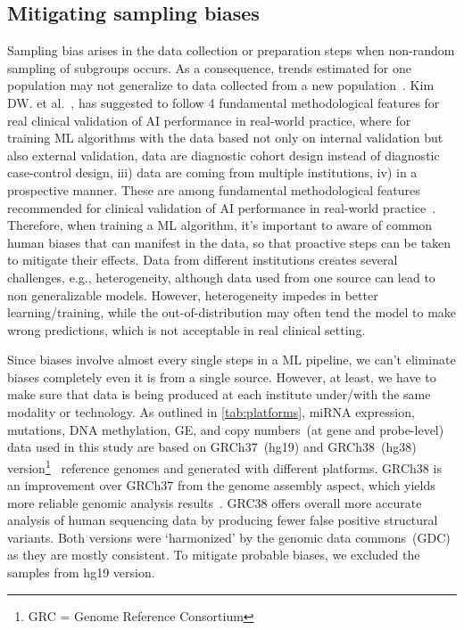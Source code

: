 \subsection{Mitigating sampling biases}
Sampling bias arises in the data collection or preparation steps when non-random sampling of subgroups occurs. As a consequence, trends estimated for one population may not generalize to data collected from a new population~\cite{mehrabi2019survey}. Kim DW. et al.~\cite{kim2019design}, has suggested to follow 4 fundamental methodological features for real clinical validation of AI performance in real-world practice, where for training ML algorithms with the data based not only on internal validation but also external validation, data are diagnostic cohort design instead of diagnostic case-control design, iii) data are coming from multiple institutions, iv) in a prospective manner. These are among fundamental methodological features recommended for clinical validation of AI performance in real-world practice~\cite{kim2019design}. Therefore, when training a ML algorithm, it's important to aware of common human biases that can manifest in the data, so that proactive steps can be taken to mitigate their effects. Data from different institutions creates several challenges, e.g., heterogeneity, although data used from one source can lead to non generalizable models. However, heterogeneity impedes in better learning/training, while the out-of-distribution may often tend the model to make wrong predictions, which is not acceptable in real clinical setting. 

\hspace*{3.5mm} Since biases involve almost every single steps in a ML pipeline, we can't eliminate biases completely even it is from a single source. However, at least, we have to make sure that data is being produced at each institute under/with the same modality or technology. As outlined in \cref{tab:platforms}, miRNA expression, mutations, DNA methylation, GE, and copy numbers~(at gene and probe-level) data used in this study are based on GRCh37~(hg19) and GRCh38~(hg38) version\footnote{GRC = Genome Reference Consortium}~\cite{gao2019before} reference genomes and generated with different platforms. GRCh38 is an improvement over GRCh37 from the genome assembly aspect, which yields more reliable genomic analysis results~\cite{guo2017improvements}. GRC38 offers overall more accurate analysis of human sequencing data by producing fewer false positive structural variants. Both versions were ‘harmonized’ by the genomic data commons~(GDC) as they are mostly consistent\cite{guo2017improvements}. To mitigate probable biases, we excluded the samples from hg19 version.  

